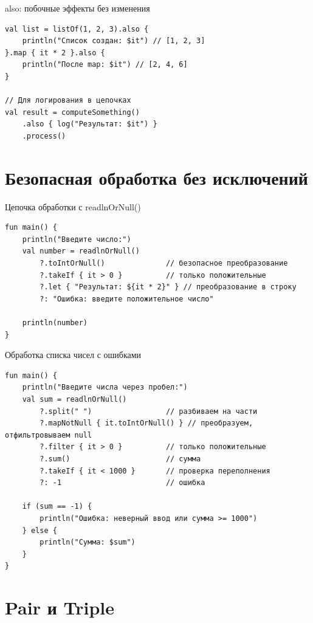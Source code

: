 \documentclass[aspectratio=169]{beamer}
\begin{document}
\begin{frame}[fragile]{also: побочные эффекты без изменения}
\lstset{language=Kotlin}
\begin{lstlisting}
val list = listOf(1, 2, 3).also {
    println("Список создан: $it") // [1, 2, 3]
}.map { it * 2 }.also {
    println("После map: $it") // [2, 4, 6]
}

// Для логирования в цепочках
val result = computeSomething()
    .also { log("Результат: $it") }
    .process()
\end{lstlisting}
\end{frame}

\section{Безопасная обработка без исключений}

\begin{frame}[fragile]{Цепочка обработки с readlnOrNull()}
\lstset{language=Kotlin}
\begin{lstlisting}
fun main() {
    println("Введите число:")
    val number = readlnOrNull()
        ?.toIntOrNull()              // безопасное преобразование
        ?.takeIf { it > 0 }          // только положительные
        ?.let { "Результат: ${it * 2}" } // преобразование в строку
        ?: "Ошибка: введите положительное число"

    println(number)
}
\end{lstlisting}
\end{frame}

\begin{frame}[fragile]{Обработка списка чисел с ошибками}
\lstset{language=Kotlin}
\begin{lstlisting}
fun main() {
    println("Введите числа через пробел:")
    val sum = readlnOrNull()
        ?.split(" ")                 // разбиваем на части
        ?.mapNotNull { it.toIntOrNull() } // преобразуем, отфильтровываем null
        ?.filter { it > 0 }          // только положительные
        ?.sum()                      // сумма
        ?.takeIf { it < 1000 }       // проверка переполнения
        ?: -1                        // ошибка

    if (sum == -1) {
        println("Ошибка: неверный ввод или сумма >= 1000")
    } else {
        println("Сумма: $sum")
    }
}
\end{lstlisting}
\end{frame}

\section{Pair и Triple}
\end{document}
